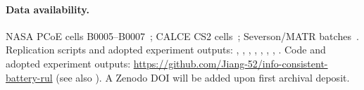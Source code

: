 \paragraph{Data availability.}
NASA PCoE cells B0005--B0007~\cite{saha2007nasa}; CALCE CS2 cells~\cite{he2011calce}; Severson/MATR batches~\cite{severson2019nature}.
Replication scripts and adopted experiment outputs: , , , , , , , .
Code and adopted experiment outputs: \url{https://github.com/Jiang-52/info-consistent-battery-rul} (see also ). A Zenodo DOI will be added upon first archival deposit.



